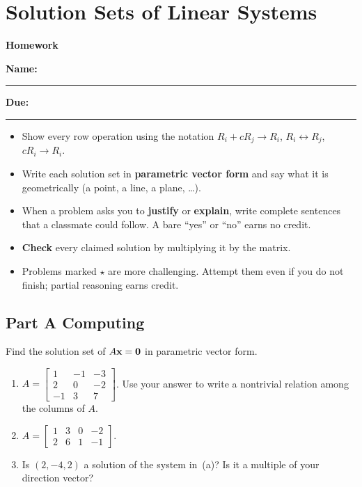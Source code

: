 \documentclass[11pt]{article}
\begin{document}
\section{Solution Sets of Linear Systems}

{\Large\bfseries Homework}\par

\textbf{Name:} \rule{2.6in}{0.4pt}\qquad\textbf{Due:} \rule{1.4in}{0.4pt}

\begin{howto}
\begin{itemize}[nosep]
  \item Show every row operation using the notation $R_i+cR_j\to R_i$, $R_i\leftrightarrow R_j$, $cR_i\to R_i$.
  \item Write each solution set in \textbf{parametric vector form} and say what it is geometrically (a point, a line, a plane, \dots).
  \item When a problem asks you to \textbf{justify} or \textbf{explain}, write complete sentences that a classmate
        could follow. A bare ``yes'' or ``no'' earns no credit.
  \item \textbf{Check} every claimed solution by multiplying it by the matrix.
  \item Problems marked $\star$ are more challenging. Attempt them even if you do not finish; partial
        reasoning earns credit.
\end{itemize}
\end{howto}

\subsection*{Part A \quad Computing}

Find the solution set of $A\mathbf{x}=\mathbf{0}$ in parametric vector form.
\begin{enumerate}
  \item $A=\begin{bmatrix}1&-1&-3\\2&0&-2\\-1&3&7\end{bmatrix}$. Use your answer to write a nontrivial relation among the columns of $A$.
  \item $A=\begin{bmatrix}1&3&0&-2\\2&6&1&-1\end{bmatrix}$.
  \item Is $(2,-4,2)$ a solution of the system in~(a)? Is it a multiple of your direction vector?
\end{enumerate}
\end{document}
